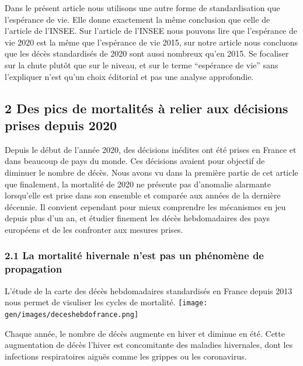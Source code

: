 \documentclass[
]{article}
\begin{document}
Dans le présent article nous utilisons une autre forme de
standardisation que l'espérance de vie. Elle donne exactement la même
conclusion que celle de l'article de l'INSEE. Sur l'article de l'INSEE
nous pouvons lire que l'espérance de vie 2020 est la même que
l'espérance de vie 2015, sur notre article nous concluons que les décès
standardisés de 2020 sont aussi nombreux qu'en 2015. Se focaliser sur la
chute plutôt que sur le niveau, et sur le terme ``espérance de vie''
sans l'expliquer n'est qu'un choix éditorial et pas une analyse
approfondie.

\hypertarget{des-pics-de-mortalituxe9s-uxe0-relier-aux-duxe9cisions-prises-depuis-2020}{%
\subsection{2 Des pics de mortalités à relier aux décisions prises
depuis
2020}\label{des-pics-de-mortalituxe9s-uxe0-relier-aux-duxe9cisions-prises-depuis-2020}}

Depuis le début de l'année 2020, des décisions inédites ont été prises
en France et dans beaucoup de pays du monde. Ces décisions avaient pour
objectif de diminuer le nombre de décès. Nous avons vu dans la première
partie de cet article que finalement, la mortalité de 2020 ne présente
pas d'anomalie alarmante lorsqu'elle est prise dans son ensemble et
comparée aux années de la dernière décennie. Il convient cependant pour
mieux comprendre les mécanismes en jeu depuis plus d'un an, et étudier
finement les décès hebdomadaires des pays européens et de les confronter
aux mesures prises.

\hypertarget{la-mortalituxe9-hivernale-nest-pas-un-phuxe9nomuxe8ne-de-propagation}{%
\subsubsection{2.1 La mortalité hivernale n'est pas un phénomène de
propagation}\label{la-mortalituxe9-hivernale-nest-pas-un-phuxe9nomuxe8ne-de-propagation}}

L'étude de la carte des décès hebdomadaires standardisés en France
depuis 2013 nous permet de visuliser les cycles de mortalité.
\texttt{[image: gen/images/deceshebdofrance.png]}

Chaque année, le nombre de décès augmente en hiver et diminue en été.
Cette augmentation de décès l'hiver est concomitante des maladies
hivernales, dont les infections respiratoires aiguës comme les grippes
ou les coronavirus.
\end{document}
